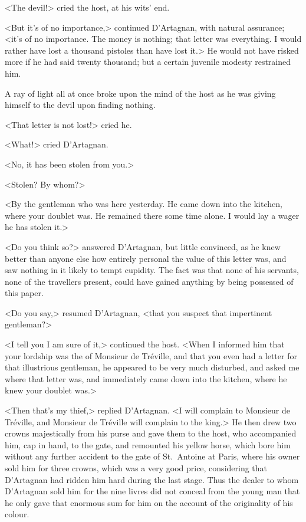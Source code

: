 <The devil!> cried the host, at his wits' end. 

<But it's of no importance,> continued D'Artagnan, with natural assurance; <it's of no importance. The money is nothing; that letter was everything. I would rather have lost a thousand pistoles than have lost it.> He would not have risked more if he had said twenty thousand; but a certain juvenile modesty restrained him. 

A ray of light all at once broke upon the mind of the host as he was giving himself to the devil upon finding nothing. 

<That letter is not lost!> cried he. 

<What!> cried D'Artagnan. 

<No, it has been stolen from you.> 

<Stolen? By whom?> 

<By the gentleman who was here yesterday. He came down into the kitchen, where your doublet was. He remained there some time alone. I would lay a wager he has stolen it.> 

<Do you think so?> answered D'Artagnan, but little convinced, as he knew better than anyone else how entirely personal the value of this letter was, and saw nothing in it likely to tempt cupidity. The fact was that none of his servants, none of the travellers present, could have gained anything by being possessed of this paper. 

<Do you say,> resumed D'Artagnan, <that you suspect that impertinent gentleman?> 

<I tell you I am sure of it,> continued the host. <When I informed him that your lordship was the  of Monsieur de Tréville, and that you even had a letter for that illustrious gentleman, he appeared to be very much disturbed, and asked me where that letter was, and immediately came down into the kitchen, where he knew your doublet was.> 

<Then that's my thief,> replied D'Artagnan. <I will complain to Monsieur de Tréville, and Monsieur de Tréville will complain to the king.> He then drew two crowns majestically from his purse and gave them to the host, who accompanied him, cap in hand, to the gate, and remounted his yellow horse, which bore him without any further accident to the gate of St.~Antoine at Paris, where his owner sold him for three crowns, which was a very good price, considering that D'Artagnan had ridden him hard during the last stage. Thus the dealer to whom D'Artagnan sold him for the nine livres did not conceal from the young man that he only gave that enormous sum for him on the account of the originality of his colour. 

